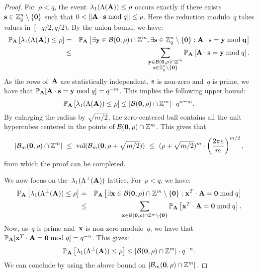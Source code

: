 \begin{proof}
For~$\rho < q$, the event~$\lambda_1(\Lambda({\bf A})) \leq \rho$ occurs exactly if there exists~${\bf s} \in \mZ_q^n \setminus \{\bf 0\}$ 
such that $0 < \|{\bf A} \cdot {\bf s} \bmod q \|\leq \rho$. Here the reduction modulo~$q$ takes values in~$[-q/2,q/2)$. 
By the union bound, we have:
\begin{eqnarray*}
\Pr_{\bf A} \left[\lambda_1(\Lambda({\bf A})) \leq \rho \right] & = & \Pr_{\bf A} \left[\exists {\bf y} \in \mathcal{B}({\bf 0},\rho) \cap \mZ^m, \exists {\bf s} \in \mZ_q^n \setminus \{\bf 0\}: {\bf A} \cdot {\bf s} = {\bf y} \bmod q \right] \\
&\leq& 
\sum_{\substack{{\bf y} \in \mathcal{B}({\bf 0},\rho) \cap \mZ^m\\ {\bf s} \in \mZ_q^n \setminus \{\bf 0\}}} 
 \Pr_{\bf A} \left[{\bf A} \cdot {\bf s} = {\bf y} \bmod q \right].
\end{eqnarray*}
As the rows of~${\bf A}$ are statistically independent, ${\bf s}$ is non-zero and~$q$ is prime, we have that $\Pr_{\bf A} [{\bf A} \cdot {\bf s} = {\bf y} \bmod q ] = q^{-m}$. This implies the following upper bound:
\[
\Pr_{\bf A} \left[\lambda_1(\Lambda({\bf A})) \leq \rho \right] \leq \left|\mathcal{B}({\bf 0},\rho) \cap \mZ^m\right| \cdot q^{n-m}.
\]
By enlarging the radius by $\sqrt{m/2}$, the zero-centered ball contains all the unit hypercubes centered in the points of $\mathcal{B}({\bf 0},\rho) \cap \mZ^m$. This gives that 
\[
|\mathcal{B}_m({\bf 0}, \rho) \cap \mZ^m| \ \leq  \ \mbox{vol}(\mathcal{B}_m({\bf 0}, \rho +\sqrt{m/2}))
\ \leq \  (\rho +\sqrt{m/2})^m \cdot \left(\frac{2\pi e}{m}\right)^{m/2},
\]
from which the proof can be completed.

We now focus on the~$\lambda_1(\Lambda^{\perp}({\bf A}))$ lattice. For~$\rho < q$, we have:
\begin{eqnarray*}
\Pr_{\bf A} \left[\lambda_1(\Lambda^{\perp}({\bf A})) \leq \rho \right] & = & \Pr_{\bf A} \left[\exists {\bf x} \in \mathcal{B}({\bf 0},\rho) \cap \mZ^m \setminus \{{\bf 0}\}: {\bf x}^T \cdot {\bf A} = {\bf 0} \bmod q \right] \\
&\leq& 
\sum_{{\bf x} \in \mathcal{B}({\bf 0},\rho) \cap \mZ^m \setminus \{\bf 0\}}  \Pr_{\bf A} \left[{\bf x}^T \cdot {\bf A} = {\bf 0} \bmod q \right].
\end{eqnarray*}
Now, as~$q$ is prime and~${\bf x}$ is non-zero modulo~$q$, we have that $ \Pr_{\bf A} [{\bf x}^T \cdot {\bf A} = {\bf 0} \bmod q] = q^{-n}$. This gives:
\[
\Pr_{\bf A} \left[\lambda_1(\Lambda^{\perp}({\bf A})) \leq \rho \right] \leq  \left|\mathcal{B}({\bf 0},\rho) \cap \mZ^m\right| \cdot q^{-n}.
\]
We can conclude by using the above bound on $|\mathcal{B}_m({\bf 0}, \rho) \cap \mZ^m|$.
\end{proof}

